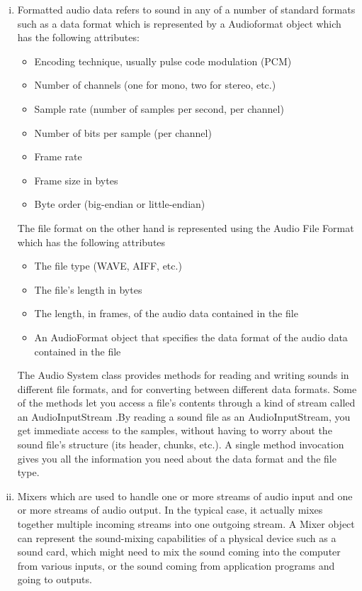 \begin{enumerate}[(i)]
        \item Formatted audio data refers to sound in any of a number of standard formats such as a data format which is represented by a Audioformat object which has the following attributes:
                \begin{itemize}
                        \item Encoding technique, usually pulse code modulation (PCM)
                        \item Number of channels (one for mono, two for stereo, etc.)
                        \item Sample rate (number of samples per second, per channel)
                        \item Number of bits per sample (per channel)
                        \item Frame rate
                        \item Frame size in bytes
                        \item Byte order (big-endian or little-endian)
                \end{itemize}
                The file format on the other hand is represented using the Audio File Format which has the following attributes
                \begin{itemize}
                        \item The file type (WAVE, AIFF, etc.)
                        \item The file's length in bytes
                        \item The length, in frames, of the audio data contained in the file
                        \item An AudioFormat object that specifies the data format of the audio data contained in the file
                \end{itemize}
                The Audio System class provides methods for reading and writing sounds in different file formats, and for converting between different data formats. Some of the methods let you access a file's contents through a kind of stream called an AudioInputStream .By reading a sound file as an AudioInputStream, you get immediate access to the samples, without having to worry about the sound file's structure (its header, chunks, etc.). A single method invocation gives you all the information you need about the data format and the file type.
        \item  Mixers which are used to handle one or more streams of audio input and one or more streams of audio output. In the typical case, it actually mixes together multiple incoming streams into one outgoing stream. A Mixer object can represent the sound-mixing capabilities of a physical device such as a sound card, which might need to mix the sound coming into the computer from various inputs, or the sound coming from application programs and going to outputs.

\end{enumerate}
